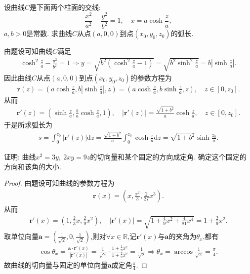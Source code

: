 \documentclass[../../main.tex]{subfiles}%
\begin{document}
\begin{example}
设曲线$C$是下面两个柱面的交线:
\[
\frac{x^2}{a^2} - \frac{y^2}{b^2} = 1,\quad x = a \cosh \frac{z}{a},
\]
$a,b>0$是常数. 求曲线$C$从点$(a,0,0)$到点$(x_0, y_0, z_0)$的弧长.
\end{example}
\begin{solution}
由题设可知曲线$C$满足
\begin{align*}
\cosh^2\frac{z}{a}-\frac{y^2}{b^2}=1\Longrightarrow y=\sqrt{b^2\left( \cosh^2\frac{z}{a}-1 \right)}=\sqrt{b^2\sinh^2\frac{z}{a}}=b\left| \sinh\frac{z}{a} \right|.
\end{align*}
因此曲线$C$从点$(a,0,0)$到点$(x_0,y_0,z_0)$的参数方程为
\begin{align*}
\bm{r}(z)=\left( a\cosh\frac{z}{a},b\left| \sinh\frac{z}{a} \right|,z \right)=\left( a\cosh\frac{z}{a},b\sinh\frac{z}{a},z \right),\quad z\in [0,z_0].
\end{align*}
从而
\begin{align*}
\bm{r}'(z)=\left( \sinh\frac{z}{a},\frac{b}{a}\cosh\frac{z}{a},1 \right),\quad |\bm{r}'(z)|=\frac{\sqrt{1+b^2}}{a}\cosh\frac{z}{a},\quad z\in [0,z_0].
\end{align*}
于是所求弧长为
\begin{align*}
s=\int_0^{z_0} |\bm{r}'(z)|\mathrm{d}z=\frac{\sqrt{1+b^2}}{a}\int_0^{z_0} \cosh\frac{z}{a}\mathrm{d}z=\sqrt{1+b^2}\sinh\frac{z_0}{a}.
\end{align*}

\end{solution}

\begin{example}
证明: 曲线$x^2 = 3y,\ 2xy = 9z$的切向量和某个固定的方向成定角. 确定这个固定的方向和该角的大小.
\end{example}
\begin{proof}
由题设可知曲线的参数方程为
\begin{align*}
\bm{r}(x)=\left(x,\frac{x^2}{3},\frac{2}{27}x^3\right).
\end{align*}
从而
\begin{align*}
\bm{r}'(x)=\left(1,\frac{2}{3}x,\frac{2}{9}x^2\right),\quad |\bm{r}'(x)|=\sqrt{1+\frac{4}{9}x^2+\frac{4}{81}x^4}=1+\frac{2}{9}x^2.
\end{align*}
取单位向量$\bm{a}=\left(\frac{1}{\sqrt{2}},0,\frac{1}{\sqrt{2}}\right)$,则对$\forall x\in \mathbb{R}$,记$\bm{r}'(x)$与$\bm{a}$的夹角为$\theta_x$,都有
\begin{align*}
\cos \theta _x=\frac{\boldsymbol{a}\cdot \boldsymbol{r}' (x)}{|\boldsymbol{r}' (x)|}=\frac{1}{\sqrt{2}}\cdot \frac{1+\frac{2}{9}x^2}{1+\frac{2}{9}x^2}=\frac{1}{\sqrt{2}}\Longrightarrow \theta _x=\arccos \frac{1}{\sqrt{2}}=\frac{\pi}{4}.
\end{align*}
故曲线的切向量与固定的单位向量$\bm{a}$成定角$\frac{\pi}{4}$.
\end{proof}
\end{document}
